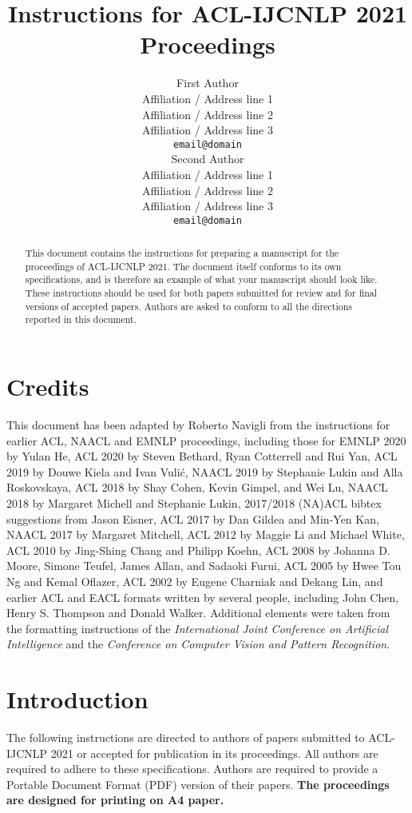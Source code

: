 \documentclass[11pt,a4paper]{article}
\title{Instructions for ACL-IJCNLP 2021 Proceedings}
\author{First Author \\
	Affiliation / Address line 1 \\
	Affiliation / Address line 2 \\
	Affiliation / Address line 3 \\
	\texttt{email@domain} \\\And
	Second Author \\
	Affiliation / Address line 1 \\
	Affiliation / Address line 2 \\
	Affiliation / Address line 3 \\
	\texttt{email@domain} \\}
\date{}
\begin{document}
	\maketitle
	\begin{abstract}
		This document contains the instructions for preparing a manuscript for the proceedings of ACL-IJCNLP 2021.
		The document itself conforms to its own specifications, and is therefore an example of what your manuscript should look like.
		These instructions should be used for both papers submitted for review and for final versions of accepted papers.
		Authors are asked to conform to all the directions reported in this document.
	\end{abstract}
	
	\section{Credits}
	
	This document has been adapted by Roberto Navigli
	from the instructions for earlier ACL, NAACL and EMNLP proceedings, including those for 
	EMNLP 2020 by Yulan He,
	ACL 2020 by Steven Bethard, Ryan Cotterrell and Rui Yan, 
	ACL 2019 by Douwe Kiela and Ivan Vuli\'{c},
	NAACL 2019 by Stephanie Lukin and Alla Roskovskaya, 
	ACL 2018 by Shay Cohen, Kevin Gimpel, and Wei Lu, 
	NAACL 2018 by Margaret Michell and Stephanie Lukin,
	2017/2018 (NA)ACL bibtex suggestions from Jason Eisner,
	ACL 2017 by Dan Gildea and Min-Yen Kan, 
	NAACL 2017 by Margaret Mitchell, 
	ACL 2012 by Maggie Li and Michael White, 
	ACL 2010 by Jing-Shing Chang and Philipp Koehn, 
	ACL 2008 by Johanna D. Moore, Simone Teufel, James Allan, and Sadaoki Furui, 
	ACL 2005 by Hwee Tou Ng and Kemal Oflazer, 
	ACL 2002 by Eugene Charniak and Dekang Lin, 
	and earlier ACL and EACL formats written by several people, including
	John Chen, Henry S. Thompson and Donald Walker.
	Additional elements were taken from the formatting instructions of the \emph{International Joint Conference on Artificial Intelligence} and the \emph{Conference on Computer Vision and Pattern Recognition}.
	
	\section{Introduction}
	
	The following instructions are directed to authors of papers submitted to ACL-IJCNLP 2021 or accepted for publication in its proceedings.
	All authors are required to adhere to these specifications.
	Authors are required to provide a Portable Document Format (PDF) version of their papers.
	\textbf{The proceedings are designed for printing on A4 paper.}
	
\end{document}
